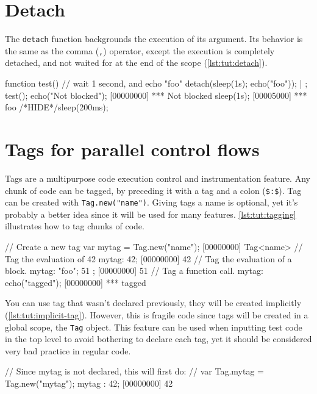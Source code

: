 \section{Detach}

The \lstinline{detach} function backgrounds the execution of its
argument. Its behavior is the same as the comma (\lstinline{,}) operator,
except the execution is completely detached, and not waited for at the
end of the scope (\autoref{lst:tut:detach}).

\begin{urbiscript}[caption=Detach, label=lst:tut:detach]
function test()
{
  // wait 1 second, and echo "foo"
  detach({sleep(1s); echo("foo")});
} | {};
test();
echo("Not blocked");
[00000000] *** Not blocked
sleep(1s);
[00005000] *** foo
/*HIDE*/sleep(200ms);
\end{urbiscript}

\section{Tags for parallel control flows}

Tags are a multipurpose code execution control and instrumentation
feature. Any chunk of code can be tagged, by preceding it with a tag
and a colon (\lstinline{$:$}). Tag can be created with
\lstinline|Tag.new("name")|. Giving tags a name is optional, yet it's
probably a better idea since it will be used for many
features. \autoref{lst:tut:tagging} illustrates how to tag chunks of code.

\begin{urbiscript}[caption=Tagging a block of code, label=lst:tut:tagging]
// Create a new tag
var mytag = Tag.new("name");
[00000000] Tag<name>
// Tag the evaluation of 42
mytag: 42;
[00000000] 42
// Tag the evaluation of a block.
mytag: { "foo"; 51 };
[00000000] 51
// Tag a function call.
mytag: echo("tagged");
[00000000] *** tagged
\end{urbiscript}

You can use tag that wasn't declared previously, they will be created
implicitly (\autoref{lst:tut:implicit-tag}). However, this is fragile code since
tags will be created in a global scope, the \lstinline{Tag} object. This
feature can be used when inputting test code in the top level to avoid
bothering to declare each tag, yet it should be considered very bad
practice in regular code.

\begin{urbiscript}[caption=Tag created implicitly,
label=lst:tut:implicit-tag]
// Since mytag is not declared, this will first do:
// var Tag.mytag = Tag.new("mytag");
mytag : 42;
[00000000] 42
\end{urbiscript}

